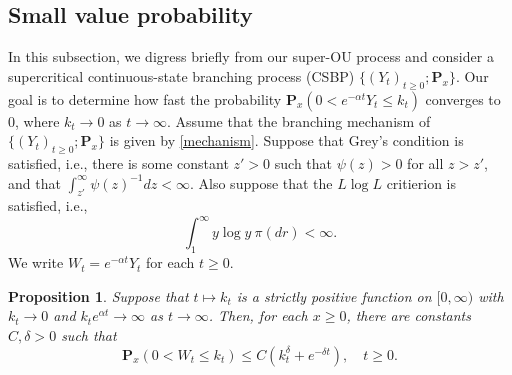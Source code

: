 \documentclass[12pt,a4paper]{amsart}
\theoremstyle{plain}
\newtheorem{prop}[thm]{Proposition}
\theoremstyle{definition}
\numberwithin{equation}{section}
\begin{document}
\subsection{Small value probability}
    In this subsection, we digress briefly from our super-OU process and consider a supercritical continuous-state branching process (CSBP)
        $\{(Y_t)_{t\geq 0}; \mathbf P_x\}$.
    Our goal is to determine how fast the probability $\mathbf P_x(0<e^{-\alpha t}Y_t \leq k_t)$ 
   converges to $0$, where $k_t \to 0$ as $t\to \infty$.
   Assume that the branching mechanism of  $\{(Y_t)_{t\geq 0}; \mathbf P_x\}$ is given by \eqref{mechanism}.
    Suppose that Grey's condition is satisfied, i.e., there is some constant $z' > 0$ such that $\psi(z) > 0$ for all $z>z'$, and that $\int_{z'}^\infty \psi(z)^{-1}dz < \infty$.
    Also suppose that the $L \log L$ critierion is satisfied, i.e.,
\[
    \int_1^\infty y \log y~\pi(dr)< \infty.
\]
    We write $W_t = e^{-\alpha t}Y_t$ for each $t\geq 0$.
\begin{prop}
\label{lem: control of XT}
    Suppose that $t\mapsto k_t$ is a strictly positive function on $[0,\infty)$ with $k_t \to 0$ and $k_t e^{\alpha t} \to \infty$ as $t\to \infty$.
    Then, for each $x\geq 0$, there are constants $C,\delta>0$ such that
\[
    \mathbf P_x(0<W_t\leq k_t) \leq C(k_t^\delta + e^{-\delta t}), \quad t\geq 0.
\]
\end{prop}
\end{document}
